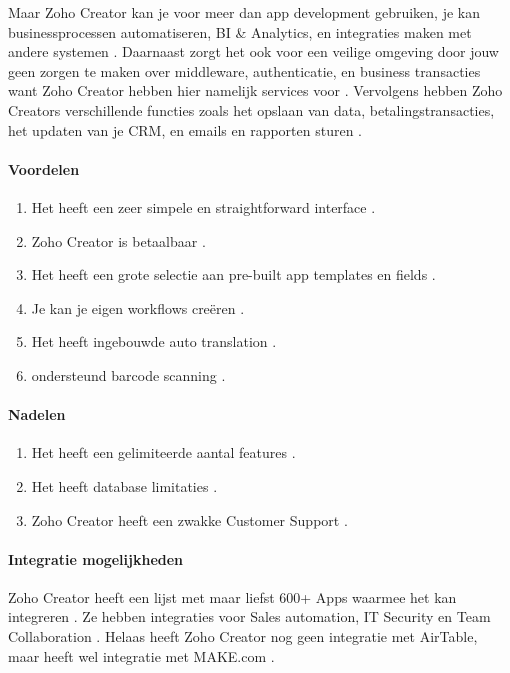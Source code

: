 Maar Zoho Creator kan je voor meer dan app development gebruiken, je kan businessprocessen automatiseren, BI \& Analytics, en integraties maken met andere systemen \autocite{ZohoCorporation2024b}. Daarnaast zorgt het ook voor een veilige omgeving door 
jouw geen zorgen te maken over middleware, authenticatie, en business transacties want Zoho Creator hebben hier namelijk services voor \autocite{ZohoCorporation2024b}. Vervolgens hebben Zoho Creators verschillende functies zoals het opslaan van data,
betalingstransacties, het updaten van je CRM, en emails en rapporten sturen \autocite{ZohoCorporation2024b}.

\paragraph*{Voordelen}
\begin{enumerate}
    \item Het heeft een zeer simpele en straightforward interface \autocite{Marvin2017Zoho}.
    \item Zoho Creator is betaalbaar  \autocite{Marvin2017Zoho}.
    \item Het heeft een grote selectie aan pre-built app templates en fields \autocite{Marvin2017Zoho}.
    \item Je kan je eigen workflows creëren \autocite{Marvin2017Zoho}.
    \item Het heeft ingebouwde auto translation \autocite{Marvin2017Zoho}.
    \item ondersteund barcode scanning \autocite{Marvin2017Zoho}.
\end{enumerate}


\paragraph*{Nadelen}
\begin{enumerate}
    \item Het heeft een gelimiteerde aantal features \autocite{G22024}.
    \item Het heeft database limitaties \autocite{G22024}.
    \item Zoho Creator heeft een zwakke Customer Support \autocite{G22024}.
\end{enumerate}

\paragraph{Integratie mogelijkheden}
Zoho Creator heeft een lijst met maar liefst 600+ Apps waarmee het kan integreren \autocite{ZohoCorporation2024b}. Ze hebben integraties voor Sales automation, IT Security en Team Collaboration \autocite{ZohoCorporation2024b}.
Helaas heeft Zoho Creator nog geen integratie met AirTable, maar heeft wel integratie met MAKE.com \autocite{MAKE.com2024}.

